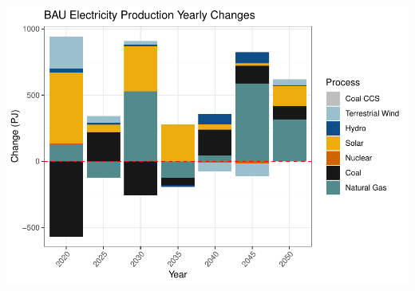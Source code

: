 \documentclass[]{article}
\begin{document}
\includegraphics{osw_Report_files/figure-latex/unnamed-chunk-49-1.pdf}
\end{document}
